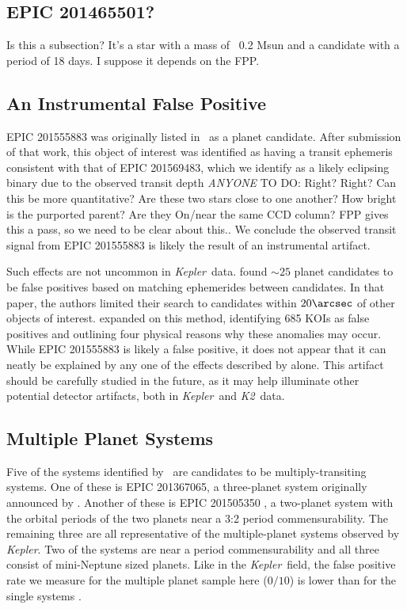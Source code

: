 \documentclass{emulateapj}
\newcommand{\project}[1]{\textsl{#1}}
\newcommand{\kep}{\project{Kepler}}
\newcommand{\KT}{\project{K2}}
\newcommand{\paperit}{\citet{Foreman-Mackey15}}
\newcommand{\todo}[3]{{\color{#2} \emph{#1} TO DO: #3}}
\newcommand{\anytodo}[1]{\todo{ANYONE}{NavyBlue}{#1}}
\begin{document}
\subsection{EPIC 201465501?}
Is this a subsection? It's a star with a mass of ~0.2 Msun and a candidate with
a period of 18 days. I suppose it depends on the FPP.

\subsection{An Instrumental False Positive}

EPIC 201555883 was originally listed in \paperit\ as a planet candidate.
After submission of that work, this object of interest was identified as
having a transit ephemeris consistent with that of EPIC 201569483,
which we identify as a likely eclipsing binary due to the observed transit
depth \anytodo{Right? Right?  Can this be more quantitative?  Are these two stars 
close to one another?  How bright is  the purported parent? Are they 
On/near the same CCD column?  FPP gives this a pass, so we 
need to be clear about this.}.
We conclude the observed transit signal from EPIC 201555883 is likely the result
of an instrumental artifact.

Such effects are not uncommon in \kep\ data.
\citet{Batalha13} found $\sim 25$ planet candidates to be false positives based on matching
ephemerides between candidates.
In that paper, the authors limited their search to candidates within $20\arcsec$ of other
objects of interest.
\citet{Coughlin14} expanded on this method, identifying 685 KOIs as false positives and
outlining four physical reasons why these anomalies may occur.
While EPIC 201555883 is likely a false positive, it does not appear that it can neatly be
explained by any one of the effects described by \citet{Coughlin14} alone.
This artifact should be carefully studied in the future, as it may help illuminate other
potential detector artifacts, both in \kep\ and \KT\ data.


\subsection{Multiple Planet Systems}
Five of the systems identified by \paperit\ are candidates to be multiply-transiting
systems.
One of these is EPIC 201367065, a three-planet system originally announced by
\citet{Crossfield15}.
Another of these is EPIC 201505350 \citep{Armstrong15b}, a two-planet system with the
orbital periods of the two planets near a 3:2 period commensurability.
The remaining three are all representative of the multiple-planet systems observed by
\kep \citep{Lissauer11b, Fabrycky14}.
Two of the systems are near a period commensurability and all three consist of
mini-Neptune sized planets.
Like in the \kep\ field, the false positive rate we measure for the multiple planet sample
here ($0/10$) is lower than for the single systems \citep{Lissauer12, Rowe14}.
\end{document}
